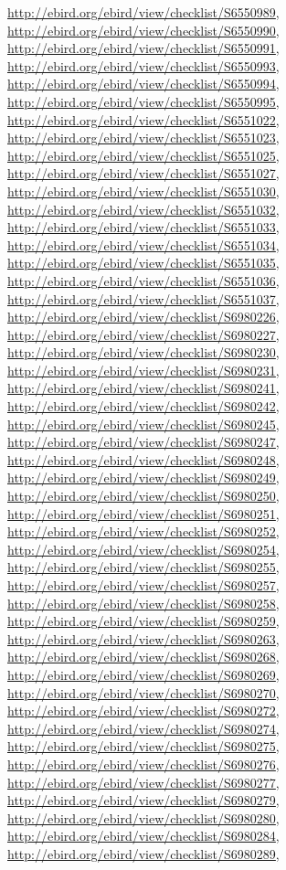 \documentclass[9pt, article]{memoir}
\begin{document}
\begin{multicols}{2}
\url{http://ebird.org/ebird/view/checklist/S6550989}, 
\url{http://ebird.org/ebird/view/checklist/S6550990}, 
\url{http://ebird.org/ebird/view/checklist/S6550991}, 
\url{http://ebird.org/ebird/view/checklist/S6550993}, 
\url{http://ebird.org/ebird/view/checklist/S6550994}, 
\url{http://ebird.org/ebird/view/checklist/S6550995}, 
\url{http://ebird.org/ebird/view/checklist/S6551022}, 
\url{http://ebird.org/ebird/view/checklist/S6551023}, 
\url{http://ebird.org/ebird/view/checklist/S6551025}, 
\url{http://ebird.org/ebird/view/checklist/S6551027}, 
\url{http://ebird.org/ebird/view/checklist/S6551030}, 
\url{http://ebird.org/ebird/view/checklist/S6551032}, 
\url{http://ebird.org/ebird/view/checklist/S6551033}, 
\url{http://ebird.org/ebird/view/checklist/S6551034}, 
\url{http://ebird.org/ebird/view/checklist/S6551035}, 
\url{http://ebird.org/ebird/view/checklist/S6551036}, 
\url{http://ebird.org/ebird/view/checklist/S6551037}, 
\url{http://ebird.org/ebird/view/checklist/S6980226}, 
\url{http://ebird.org/ebird/view/checklist/S6980227}, 
\url{http://ebird.org/ebird/view/checklist/S6980230}, 
\url{http://ebird.org/ebird/view/checklist/S6980231}, 
\url{http://ebird.org/ebird/view/checklist/S6980241}, 
\url{http://ebird.org/ebird/view/checklist/S6980242}, 
\url{http://ebird.org/ebird/view/checklist/S6980245}, 
\url{http://ebird.org/ebird/view/checklist/S6980247}, 
\url{http://ebird.org/ebird/view/checklist/S6980248}, 
\url{http://ebird.org/ebird/view/checklist/S6980249}, 
\url{http://ebird.org/ebird/view/checklist/S6980250}, 
\url{http://ebird.org/ebird/view/checklist/S6980251}, 
\url{http://ebird.org/ebird/view/checklist/S6980252}, 
\url{http://ebird.org/ebird/view/checklist/S6980254}, 
\url{http://ebird.org/ebird/view/checklist/S6980255}, 
\url{http://ebird.org/ebird/view/checklist/S6980257}, 
\url{http://ebird.org/ebird/view/checklist/S6980258}, 
\url{http://ebird.org/ebird/view/checklist/S6980259}, 
\url{http://ebird.org/ebird/view/checklist/S6980263}, 
\url{http://ebird.org/ebird/view/checklist/S6980268}, 
\url{http://ebird.org/ebird/view/checklist/S6980269}, 
\url{http://ebird.org/ebird/view/checklist/S6980270}, 
\url{http://ebird.org/ebird/view/checklist/S6980272}, 
\url{http://ebird.org/ebird/view/checklist/S6980274}, 
\url{http://ebird.org/ebird/view/checklist/S6980275}, 
\url{http://ebird.org/ebird/view/checklist/S6980276}, 
\url{http://ebird.org/ebird/view/checklist/S6980277}, 
\url{http://ebird.org/ebird/view/checklist/S6980279}, 
\url{http://ebird.org/ebird/view/checklist/S6980280}, 
\url{http://ebird.org/ebird/view/checklist/S6980284}, 
\url{http://ebird.org/ebird/view/checklist/S6980289}, 

\end{multicols}
\end{document}

